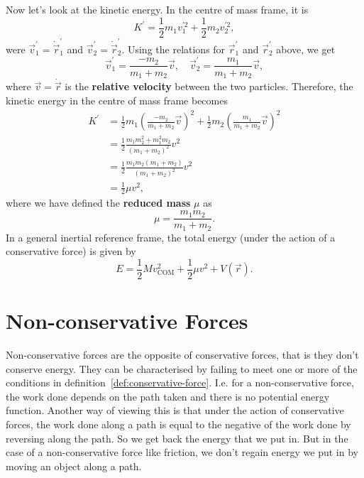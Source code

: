 \documentclass[../classical_mechanics.tex]{subfiles}
\begin{document}
        Now let's look at the kinetic energy.
        In the centre of mass frame, it is
        \begin{equation}
            K^\prime=\frac{1}{2}m_1v_1^{\prime 2}+\frac{1}{2}m_2v_2^{\prime 2},
        \end{equation}
        were $\vec{v}_1^\prime=\dot{\vec{r}}_1^\prime$ and $\vec{v}_2^\prime=\dot{\vec{r}}_2^\prime$.
        Using the relations for $\vec{r}_1^\prime$ and $\vec{r}_2^\prime$ above, we get
        \begin{equation}
            \vec{v}_1^\prime=\frac{-m_2}{m_1+m_2}\vec{v},\quad\vec{v}_2^\prime=\frac{m_1}{m_1+m_2}\vec{v},
        \end{equation}
        where $\vec{v}=\dot{\vec{r}}$ is the \textbf{relative velocity} between the two particles.
        Therefore, the kinetic energy in the centre of mass frame becomes
        \begin{align}
            K^\prime&=\frac{1}{2}m_1\left(\frac{-m_2}{m_1+m_2}\vec{v}\right)^2+\frac{1}{2}m_2\left(\frac{m_1}{m_1+m_2}\vec{v}\right)^2\\
            &=\frac{1}{2}\frac{m_1m_2^2+m_1^2m_2}{(m_1+m_2)^2}v^2\\
            &=\frac{1}{2}\frac{m_1m_2(m_1+m_2)}{(m_1+m_2)^2}v^2\\
            &=\frac{1}{2}\mu v^2,
        \end{align}
        where we have defined the \textbf{reduced mass} $\mu$ as
        \begin{equation}
            \mu=\frac{m_1m_2}{m_1+m_2}.
        \end{equation}
        In a general inertial reference frame, the total energy (under the action of a conservative force) is given by
        \begin{equation}
            E=\frac{1}{2}Mv_\text{COM}^2+\frac{1}{2}\mu v^2+V(\vec{r}).
        \end{equation}

    \section{Non-conservative Forces}\label{sec:non-conservative-forces}
        Non-conservative forces are the opposite of conservative forces, that is they don't conserve energy.
        They can be characterised by failing to meet one or more of the conditions in definition~\ref{def:conservative-force}.
        I.e. for a non-conservative force, the work done depends on the path taken and there is no potential energy function.
        Another way of viewing this is that under the action of conservative forces, the work done along a path is equal to the negative of the work done by reversing along the path.
        So we get back the energy that we put in.
        But in the case of a non-conservative force like friction, we don't regain energy we put in by moving an object along a path.
\end{document}
